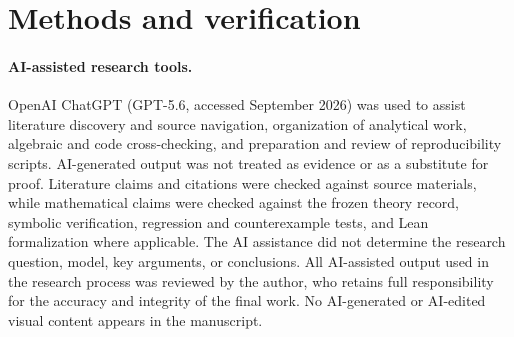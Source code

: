 \section{Methods and verification}
\label{sec:methods-verification}

\paragraph{AI-assisted research tools.}
OpenAI ChatGPT (GPT-5.6, accessed September 2026) was used to assist literature discovery and source navigation, organization of analytical work, algebraic and code cross-checking, and preparation and review of reproducibility scripts. AI-generated output was not treated as evidence or as a substitute for proof. Literature claims and citations were checked against source materials, while mathematical claims were checked against the frozen theory record, symbolic verification, regression and counterexample tests, and Lean formalization where applicable. The AI assistance did not determine the research question, model, key arguments, or conclusions. All AI-assisted output used in the research process was reviewed by the author, who retains full responsibility for the accuracy and integrity of the final work. No AI-generated or AI-edited visual content appears in the manuscript.
